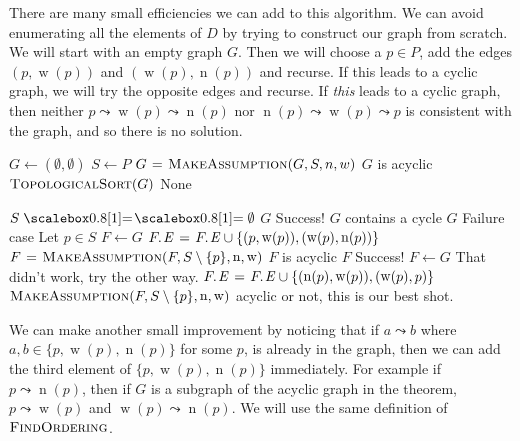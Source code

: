 \documentclass[12pt]{article}
\DeclareMathOperator{\w}{w}
\DeclareMathOperator{\n}{n}
\begin{document}
    There are many small efficiencies we can add to this algorithm. We can avoid enumerating all the elements of $D$ by trying to construct our graph from scratch. We will start with an empty graph $G$. Then we will choose a $p \in P$, add the edges $(p,\w(p))$ and $(\w(p),\n(p))$ and recurse. If this leads to a cyclic graph, we will try the opposite edges and recurse. If \emph{this} leads to a cyclic graph, then neither $p \leadsto \w(p) \leadsto \n(p)$ nor $\n(p) \leadsto \w(p) \leadsto p$ is consistent with the graph, and so there is no solution.

    \begin{codebox}
    \li $G \gets (\emptyset, \emptyset)$
    \li $S \gets P$
    \li $G \mathrel{\hspace{1pt}=\hspace{1pt}} \textnormal{\scshape MakeAssumption}(G,S,n,w)$
    \li \If $G$ is acyclic
    \li     \Do
            \Return $\textnormal{\scshape TopologicalSort}(G)$
        \End
    \li \Return None
    \end{codebox}


    \begin{codebox}
    \Procname{$\proc{MakeAssumption}(G,S,\n,\w)$}
    \li \If $S \isequal \emptyset$
    \li     \Then
            \Return $G$ \Comment Success!
        \End
    \li \If $G$ contains a cycle
    \li     \Then
            \Return $G$ \Comment Failure case
        \End
    \li Let $p \in S$
    \li $F \gets G$
    \li $\attrib{F}{E} \gets \attrib{F}{E} \cup \{(p,\w(p)), (\w(p),\n(p))\}$
    \li $F \gets \proc{MakeAssumption}(F,S\setminus \{p\}, \n, \w)$
    \li \If $F$ is acyclic
    \li     \Do
            \Return $F$ \Comment Success!
        \End
    \li $F \gets G$ \Comment That didn't work, try the other way.
    \li $\attrib{F}{E} \gets \attrib{F}{E} \cup \{(\n(p), \w(p)), (\w(p),p)\}$
    \li \Return $\proc{MakeAssumption}(F,S\setminus \{p\}, \n, \w)$ \Comment acyclic or not, this is our best shot.
    \end{codebox}

    We can make another small improvement by noticing that if $a \leadsto b$ where $a,b \in \{p, \w(p), \n(p)\}$ for some $p$, is already in the graph, then we can add the third element of $\{p, \w(p), \n(p)\}$ immediately. For example if $p \leadsto \n(p)$, then if $G$ is a subgraph of the acyclic graph in the theorem, $p \leadsto \w(p)$ and $\w(p) \leadsto \n(p)$. We will use the same definition of $\textnormal{\scshape FindOrdering}$.
\end{document}
